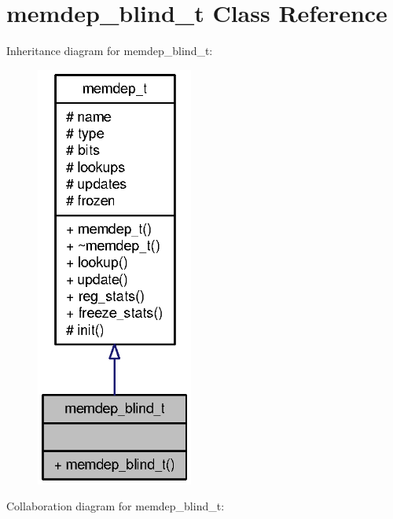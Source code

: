 \section{memdep\_\-blind\_\-t Class Reference}
\label{classmemdep__blind__t}
Inheritance diagram for memdep\_\-blind\_\-t:\nopagebreak
\begin{figure}[H]
\begin{center}
\leavevmode
\includegraphics[width=146pt]{classmemdep__blind__t__inherit__graph}
\end{center}
\end{figure}
Collaboration diagram for memdep\_\-blind\_\-t:\nopagebreak
